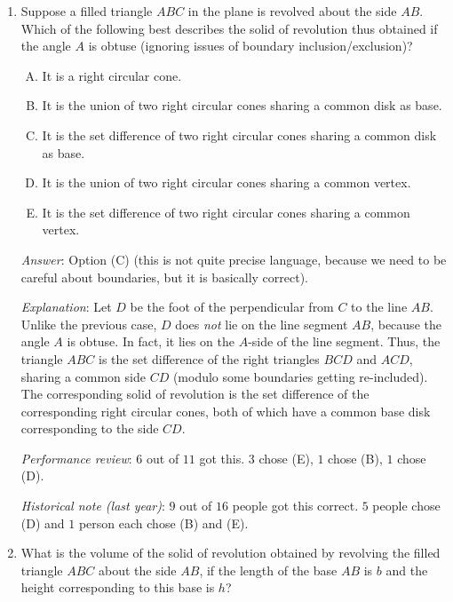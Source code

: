 \documentclass[10pt]{amsart}
\begin{document}
\begin{enumerate}
  {\em Historical note (last year)}: $13$ out of $16$ people got this
  correct. $2$ people chose (D) and $1$ person chose (A).
\item Suppose a filled triangle $ABC$ in the plane is revolved about
  the side $AB$. Which of the following best describes the solid of
  revolution thus obtained if the angle $A$ is obtuse (ignoring issues
  of boundary inclusion/exclusion)?

  \begin{enumerate}[(A)]
  \item It is a right circular cone.
  \item It is the union of two right circular cones sharing a common
    disk as base.
  \item It is the set difference of two right circular cones sharing a
    common disk as base.
  \item It is the union of two right circular cones sharing a common
    vertex.
  \item It is the set difference of two right circular cones sharing a
    common vertex.
  \end{enumerate}

  {\em Answer}: Option (C) (this is not quite precise language,
  because we need to be careful about boundaries, but it is basically correct).

  {\em Explanation}: Let $D$ be the foot of the perpendicular from $C$
  to the line $AB$. Unlike the previous case, $D$ does {\em not} lie
  on the line segment $AB$, because the angle $A$ is obtuse. In fact,
  it lies on the $A$-side of the line segment. Thus, the triangle
  $ABC$ is the set difference of the right triangles $BCD$ and $ACD$,
  sharing a common side $CD$ (modulo some boundaries getting
  re-included). The corresponding solid of revolution is the set
  difference of the corresponding right circular cones, both of which
  have a common base disk corresponding to the side $CD$.

  {\em Performance review}: $6$ out of $11$ got this. $3$ chose (E),
  $1$ chose (B), $1$ chose (D).

  {\em Historical note (last year)}: $9$ out of $16$ people got this
  correct. $5$ people chose (D) and $1$ person each chose (B) and (E).
\item What is the volume of the solid of revolution obtained by
  revolving the filled triangle $ABC$ about the side $AB$, if the
  length of the base $AB$ is $b$ and the height corresponding to this
  base is $h$?


\end{enumerate}
\end{document}
